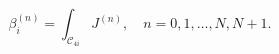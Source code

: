 \begin{equation}
\beta^{(n)}_{i} = \int_{\mathcal{C}_{4i}} J^{(n)}, 
\quad n = 0,1,\ldots,N, N+1.
\end{equation}

